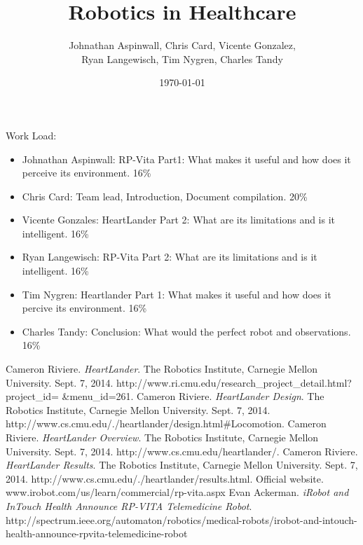 \documentclass[12pt,conference]{IEEEtran}
\title{Robotics in Healthcare}
\date{\today}
\author{Johnathan Aspinwall, Chris Card, Vicente Gonzalez, \\
Ryan Langewisch, Tim Nygren, Charles Tandy}
\begin{document}
\maketitle
\thispagestyle{plain}
\pagestyle{plain}






\appendix
Work Load:
\begin{itemize}
\item Johnathan Aspinwall: RP-Vita Part1: What makes it useful and how does it perceive its environment. 16\%
\item Chris Card: Team lead, Introduction, Document compilation. 20\%
\item Vicente Gonzales: HeartLander Part 2: What are its limitations and is it intelligent. 16\%
\item Ryan Langewisch: RP-Vita Part 2: What are its limitations and is it intelligent. 16\%
\item Tim Nygren: Heartlander Part 1: What makes it useful and how does it percive its environment. 16\%
\item Charles Tandy: Conclusion: What would the perfect robot and observations. 16\%
\end{itemize}

\begin{thebibliography}{4}
  Cameron Riviere. {\em HeartLander}. The Robotics Institute, Carnegie Mellon University. Sept. 7, 2014. http://www.ri.cmu.edu/research\_project\_detail.html?project\_id=
\&menu\_id=261.
  Cameron Riviere. {\em HeartLander Design}. The Robotics Institute, Carnegie Mellon University. Sept. 7, 2014. http://www.cs.cmu.edu/\texttildelow{}./heartlander/design.html\#Locomotion.
  Cameron Riviere. {\em HeartLander Overview}. The Robotics Institute, Carnegie Mellon University. Sept. 7, 2014. http://www.cs.cmu.edu/\texttildelow{}heartlander/.
  Cameron Riviere. {\em HeartLander Results}. The Robotics Institute, Carnegie Mellon University. Sept. 7, 2014. http://www.cs.cmu.edu/\texttildelow{}./heartlander/results.html.
 Official website.  www.irobot.com/us/learn/commercial/rp-vita.aspx
 Evan Ackerman. {\em iRobot and InTouch Health Announce RP-VITA Telemedicine Robot}. http://spectrum.ieee.org/automaton/robotics/medical-robots/irobot-and-intouch-health-announce-rpvita-telemedicine-robot
\end{thebibliography}
\end{document}
